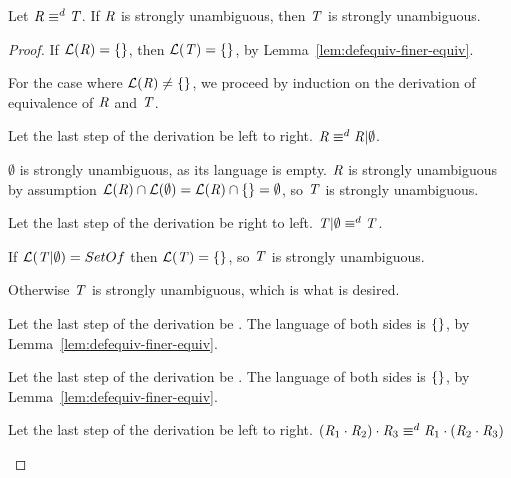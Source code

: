 \documentclass[numbers,10pt,preprint\ifanon ,nocopyrightspace\fi]{sigplanconf}
\begin{document}
\begin{lemma}
  Let $\mathit{R} \equiv^d \mathit{T}$.
  If $\mathit{R}$ is strongly unambiguous, then $\mathit{T}$ is strongly unambiguous.
\end{lemma}
\begin{proof}
  If $\mathcal{L}(\mathit{R}) = \{\}$, then $\mathcal{L}(\mathit{T}) = \{\}$,
  by Lemma~\ref{lem:defequiv-finer-equiv}.

  For the case where $\mathcal{L}(\mathit{R}) \neq \{\}$, we proceed by
  induction on the derivation of equivalence of $\mathit{R}$ and $\mathit{T}$.
  \begin{case}
    Let the last step of the derivation be \OrIdentityRule{} left to right.
    $\mathit{R} \equiv^d \mathit{R} | \emptyset$.

    $\emptyset$ is strongly unambiguous, as its language is empty.
    $\mathit{R}$ is strongly unambiguous by assumption
    $\mathcal{L}(\mathit{R}) \cap \mathcal{L}(\emptyset) =
    \mathcal{L}(\mathit{R}) \cap \{\} = \emptyset$, so $\mathit{T}$ is
    strongly unambiguous.
  \end{case}

  \begin{case}
    Let the last step of the derivation be \OrIdentityRule{} right to left.
    $\mathit{T} | \emptyset \equiv^d \mathit{T}$.

    If $\mathcal{L}(\mathit{T} | \emptyset) = SetOf{}$ then
    $\mathcal{L}(\mathit{T}) = \{\}$, so $\mathit{T}$ is strongly unambiguous.

    Otherwise $\mathit{T}$ is strongly unambiguous, which is what is desired.
  \end{case}

  \begin{case}
    Let the last step of the derivation be \EmptyProjectionRightRule{}.
    The language of both sides is $\{\}$, by
    Lemma~\ref{lem:defequiv-finer-equiv}.
  \end{case}

  \begin{case}
    Let the last step of the derivation be \EmptyProjectionLeftRule{}.
    The language of both sides is $\{\}$, by
    Lemma~\ref{lem:defequiv-finer-equiv}.
  \end{case}
  
  \begin{case}
    Let the last step of the derivation be \ConcatAssocRule{} left to right.
    $(\mathit{R}_1\cdot\mathit{R}_2)\cdot\mathit{R}_3
    \equiv^d
    \mathit{R}_1\cdot(\mathit{R}_2\cdot\mathit{R}_3)$


\end{case}
\end{proof}
\end{document}
